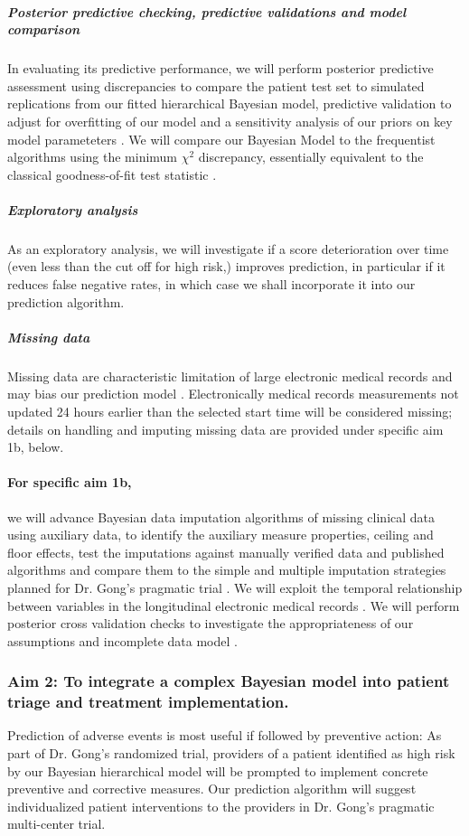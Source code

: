\documentclass[11pt,notitlepage]{article}
\begin{document}
\subparagraph*{Posterior predictive checking, predictive validations and model comparison}
In evaluating its predictive performance, we will perform posterior predictive assessment using discrepancies \cite{GelmanMengStern1996} to compare the patient test set to simulated replications from our fitted hierarchical Bayesian model, predictive validation to adjust for overfitting of our model and a sensitivity analysis of our priors on key model parameteters \cite{Gelman-Hill_2014,Gelman_predictive_2000}. We will compare our Bayesian Model to the frequentist algorithms using the minimum $\chi^{2}$ discrepancy, essentially equivalent to the classical
goodness-of-fit test statistic \cite{GelmanMengStern1996}.

\subparagraph{Exploratory analysis}
As an exploratory analysis, we will investigate if a score deterioration over time (even less than the cut off for high risk,) improves prediction, in particular if it reduces false negative rates, in which case we shall incorporate it into our prediction algorithm.

\subparagraph*{Missing data}
Missing data are characteristic limitation of large electronic medical records and may bias our prediction model \cite{Dean_19279318}. Electronically medical records measurements not updated 24 hours earlier than the selected start time will be considered missing; details on handling and imputing missing data are provided under specific aim 1b, below. 

\paragraph*{For specific aim 1b,}
we will advance Bayesian data imputation algorithms of missing clinical data using auxiliary data, to identify the auxiliary measure properties, ceiling and floor effects, test the imputations against manually verified data and published algorithms and compare them to the simple and multiple imputation strategies planned for Dr. Gong's pragmatic trial \cite{Huntington_16311133,Sloan_15027501}. We will exploit the temporal relationship between variables in the longitudinal electronic medical records \cite{Welch24782349}. We will perform posterior cross validation checks to investigate the appropriateness of our assumptions and incomplete data model \cite{Gelman1998notasked}.

\subsubsection*{Aim 2: To integrate a complex Bayesian model into patient triage and treatment implementation.}
Prediction of adverse events is most useful if followed by preventive action: As part of Dr. Gong's randomized trial, providers of a patient identified as high risk by our Bayesian hierarchical model will be prompted to implement concrete preventive and corrective measures. Our prediction algorithm will suggest individualized patient interventions to the providers in Dr. Gong's pragmatic multi-center trial. 
\end{document}
